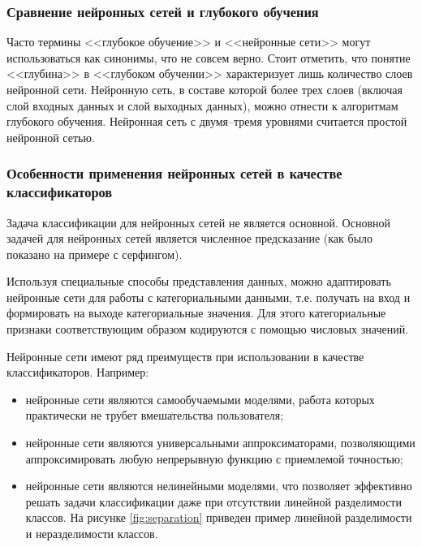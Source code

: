 \subsubsection{Сравнение нейронных сетей и глубокого обучения}

Часто термины <<глубокое обучение>> и <<нейронные сети>> могут использоваться как синонимы, что не совсем верно. Стоит отметить, что понятие <<глубина>> в <<глубоком обучении>> характеризует лишь количество слоев нейронной сети. Нейронную сеть, в составе которой более трех слоев (включая слой входных данных и слой выходных данных), можно отнести к алгоритмам глубокого обучения. Нейронная сеть с двумя--тремя уровнями считается простой нейронной сетью.

\subsubsection{Особенности применения нейронных сетей в качестве классификаторов}

Задача классификации для нейронных сетей не является основной. Основной задачей для нейронных сетей является численное предсказание (как было показано на примере с серфингом).

Используя специальные способы представления данных, можно адаптировать нейронные сети для работы с категориальными данными, т.е. получать на вход и формировать на выходе категориальные значения. Для этого категориальные признаки соответствующим образом кодируются с помощью числовых значений.

Нейронные сети имеют ряд преимуществ при использовании в качестве классификаторов. Например:
\begin{itemize}[leftmargin=1.6\parindent]
	\item нейронные сети являются самообучаемыми моделями, работа которых практически не трубет вмешательства пользователя;
	\item нейронные сети являются универсальными аппроксиматорами, позволяющими аппроксимировать любую непрерывную функцию с приемлемой точностью;
	\item нейронные сети являются нелинейными моделями, что позволяет эффективно решать задачи классификации даже при отсутствии линейной разделимости классов. На рисунке \ref{fig:separation} приведен пример линейной разделимости и неразделимости классов.
\end{itemize}

